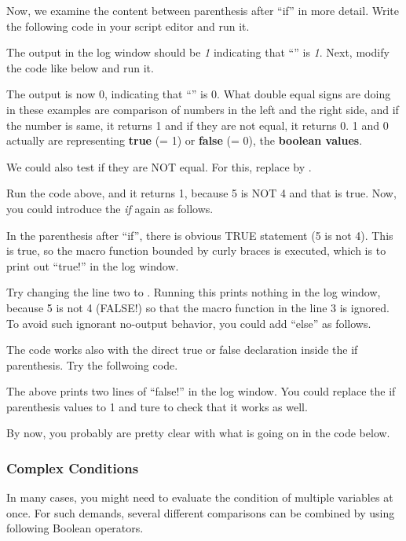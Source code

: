 Now, we examine the content between 
parenthesis after ``if'' in more detail. 
Write the following code in your script editor and run it.

The output in the log window should be \textit{1} indicating that ``'' is \textit{1}. Next, modify the code like below and run it.

The output is now 0, indicating that ``'' is
0.
What double equal signs \ilcom{==} are doing in these
examples are comparison of numbers in the left and the right side, and if
the number is same, it returns 1 and if they are not equal, it returns 0. 1 and
0 actually are representing \textbf{true} (= 1) or \textbf{false} (= 0), the
\textbf{boolean values}.

We could also test if they are NOT equal. For this, replace \ilcom{==} by
\ilcom{!=}.

Run the code above, and it returns 1, because 5 is NOT 4 and that is true. Now,
you could introduce the \textit{if} again as follows.

In the parenthesis after ``if'', there is obvious TRUE statement (5 is not 4).
This is true, so the macro function bounded by curly braces is executed, which is to
print out ``true!'' in the log window.

Try changing the line two to . Running this prints nothing
in the log window, because 5 is not 4 (FALSE!) so that the macro function in
the line 3 is ignored. To avoid such ignorant no-output behavior, you could add
``else'' as follows.



The code works also with the direct true or false
declaration inside the if parenthesis. Try the follwoing code.



The above prints two lines of ``false!'' in the log window. You could replace
the if parenthesis values to 1 and ture to check that it works as well. 

By now, you probably are pretty clear with what is going on in the code below. 


\subsubsection{Complex Conditions}
In many cases, you might need to evaluate the condition of multiple variables at once. 
For such demands, several different comparisons can be combined by using following Boolean operators. 

